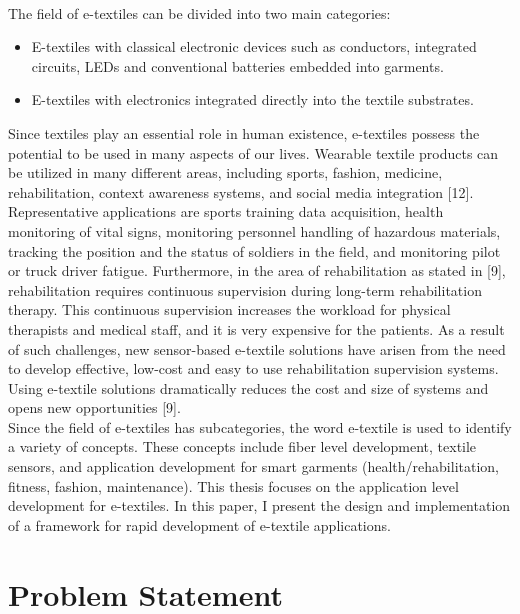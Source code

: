 \\
The field of e-textiles can be divided into two main categories:
\begin{itemize}

\item E-textiles with classical electronic devices such as conductors, integrated circuits, LEDs and conventional batteries embedded into garments.
\item E-textiles with electronics integrated directly into the textile substrates.

\end{itemize}

Since textiles play an essential role in human existence, e-textiles possess the potential to be used in many aspects of our lives. Wearable textile products can be utilized in many different areas, including sports, fashion, medicine, rehabilitation, context awareness systems, and social media integration [12]. Representative applications are sports training data acquisition, health monitoring of vital signs, monitoring personnel handling of hazardous materials, tracking the position and the status of soldiers in the field, and monitoring pilot or truck driver fatigue. Furthermore, in the area of rehabilitation as stated in [9], rehabilitation requires continuous supervision during long-term rehabilitation therapy. This continuous supervision increases the workload for physical therapists and medical staff, and it is very expensive for the patients. As a result of such challenges, new sensor-based e-textile solutions have arisen from the need to develop effective, low-cost and easy to use rehabilitation supervision systems. Using e-textile solutions dramatically reduces the cost and size of systems and opens new opportunities [9]. 
\\
Since the field of e-textiles has subcategories, the word e-textile is used to identify a variety of concepts. These concepts include fiber level development, textile sensors, and application development for smart garments (health/rehabilitation, fitness, fashion, maintenance). This thesis focuses on the application level development for e-textiles. In this paper, I present the design and implementation of a framework for rapid development of e-textile applications. 
\\

\section{Problem Statement} \label{problemStatement}

